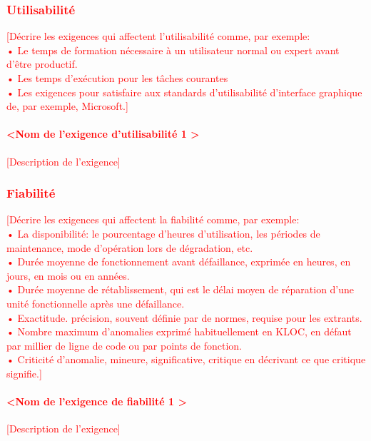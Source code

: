 \documentclass[10pt,a4paper]{report}
\begin{document}
\textcolor{red}{\subsubsection{Utilisabilité}
[Décrire les exigences qui affectent l’utilisabilité comme, par exemple:\\
•	Le temps de formation nécessaire à un utilisateur normal ou expert avant d’être productif.\\
•	Les temps d’exécution pour les tâches courantes\\
•	Les exigences pour satisfaire aux standards d’utilisabilité d’interface graphique de, par exemple, Microsoft.]
\paragraph{\textless Nom de l’exigence d’utilisabilité 1 \textgreater}
[Description de l’exigence]}

\textcolor{red}{\subsubsection{Fiabilité}
[Décrire les exigences qui affectent la fiabilité comme, par exemple:\\
•	La disponibilité: le pourcentage d’heures d’utilisation, les périodes de maintenance, mode d’opération lors de dégradation, etc.\\
•	Durée moyenne de fonctionnement avant défaillance, exprimée en heures, en jours, en mois ou en années.\\
•	Durée moyenne de rétablissement, qui est le délai moyen de réparation d'une unité fonctionnelle après une défaillance.\\
•	Exactitude. précision, souvent définie par de normes, requise pour les extrants.\\
•	Nombre maximum d’anomalies exprimé habituellement en KLOC, en défaut par millier de ligne de code ou par points de fonction.\\
•	Criticité d’anomalie, mineure, significative, critique en décrivant ce que critique signifie.]
\paragraph{\textless Nom de l’exigence de fiabilité 1 \textgreater}
[Description de l’exigence]}
\end{document}
